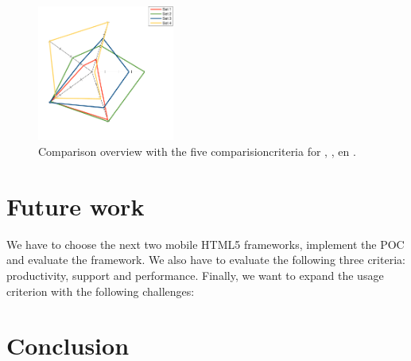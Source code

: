 \documentclass[a4paper]{artikel3}
\begin{document}
\begin{figure}
  \centering
  \includegraphics[width=0.4\textwidth]{../Masterproef/figuren/spidergraph.pdf}
  \caption{Comparison overview with the five comparisioncriteria for \st{},  \kendo{},  \jqm{} en \lungo{}.}
  \label{fig:spidergraph}
\end{figure}



\section{Future work} %
\label{sec:future_work}
We have to choose the next two mobile HTML5 frameworks, implement the POC and evaluate the framework.
We also have to evaluate the following three criteria: productivity, support and performance. 
Finally, we want to expand the usage criterion with the following challenges:



\section{Conclusion} %
\label{sec:conclusion}




%


\end{document}
